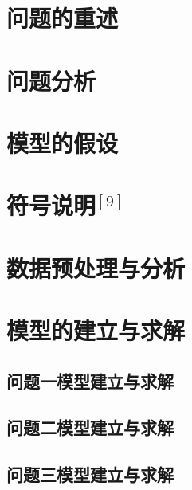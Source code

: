 \documentclass[utf8,12pt]{ctexart}
\begin{document}
	
	
	\newpage  %
	
	
	{\centering\section{问题的重述}}
     


	{\centering\section{问题分析}}
    
    
	{\centering\section{模型的假设}}
	
    

    \newpage

    {\centering\section{符号说明$^{[9]}$}}
    


    \newpage
    {\centering\section{数据预处理与分析}}
    

 
	{\centering\section{模型的建立与求解}}
	\fontsize{12pt}{12pt}\selectfont

    \subsection{问题一模型建立与求解}
    

    \subsection{问题二模型建立与求解}
    
    
\newpage
    \subsection{问题三模型建立与求解}
    
\end{document}
